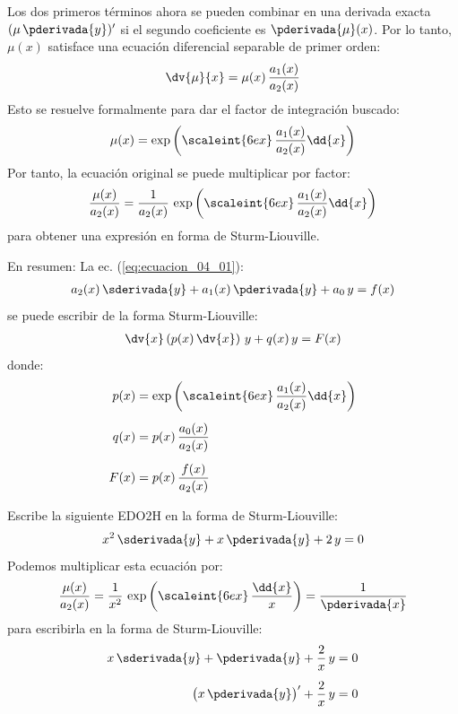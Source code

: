 Los dos primeros términos ahora se pueden combinar en una derivada exacta $( \mu \, \pderivada{y})^{\prime}$  si el segundo coeficiente es $\pderivada{\mu} (x)$. Por lo tanto, $\mu (x)$ satisface una ecuación diferencial separable de primer orden:
\begin{align*}
\dv{\mu}{x} = \mu (x) \, \dfrac{a_{1}(x)}{a_{2} (x)}
\end{align*}
Esto se resuelve formalmente para dar el factor de integración buscado:
\begin{align*}
\mu (x) = \exp \left( \scaleint{6ex} \, \dfrac{a_{1}(x)}{a_{2}(x)} \dd{x} \right)
\end{align*}
Por tanto, la ecuación original se puede multiplicar por factor:
\begin{align*}
\dfrac{\mu(x)}{a_{2}(x)} = \dfrac{1}{a_{2}(x)} \, \exp \left( \scaleint{6ex} \, \dfrac{a_{1}(x)}{a_{2}(x)} \dd{x} \right)
\end{align*}
para obtener una expresión en forma de Sturm-Liouville.
\par
\noindent
En resumen: La ec. (\ref{eq:ecuacion_04_01}):
\begin{align}
a_{2} (x) \, \sderivada{y} + a_{1} (x) \, \pderivada{y} + a_{0} \, y = f(x)
\label{eq:ecuacion_04_07}
\end{align}
se puede escribir de la forma Sturm-Liouville:
\begin{align}
\dv{x} \left( p(x) \, \dv{x} \right) \, y + q(x) \, y =  F(x)
\label{eq:ecuacion_04_08}
\end{align}
donde:
\begin{align}
\begin{aligned}
p(x) &= \exp \left( \scaleint{6ex} \, \dfrac{a_{1}(x)}{a_{2}(x)} \dd{x} \right) \\[0.5em]
q(x) &= p(x) \, \dfrac{a_{0}(x)}{a_{2}(x)} \\[0.5em]
F(x) &= p(x) \, \dfrac{f(x)}{a_{2}(x)}
\end{aligned}
\label{eq:ecuacion_04_09}
\end{align}

\begin{ejemplo}\label{Ejemplo_01}
Escribe la siguiente EDO2H en la forma de Sturm-Liouville:
\begin{align*}
x^{2} \, \sderivada{y} + x \, \pderivada{y} + 2 \, y = 0
\end{align*}
Podemos multiplicar esta ecuación por:
\begin{align*}
\dfrac{\mu (x)}{a_{2}(x)} = \dfrac{1}{x^{2}} \, \exp \left( \scaleint{6ex} \, \dfrac{\dd{x}}{x} \right) = \dfrac{1}{\pderivada{x}}
\end{align*}
para escribirla en la forma de Sturm-Liouville:
\begin{align*}
x \, \sderivada{y} + \pderivada{y} + \dfrac{2}{x} \, y &= 0 \\[0.5em]
\big( x \, \pderivada{y} \big)^{\prime} +  \dfrac{2}{x} \, y &= 0
\end{align*}
\end{ejemplo}

